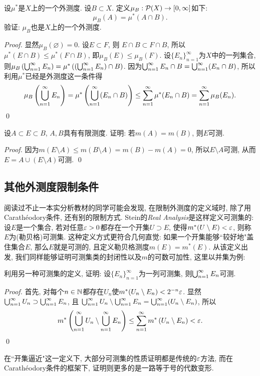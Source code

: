 \begin{exercise}
    设$\mu^*$是$X$上的一个外测度.
    设$B \subset X$. 定义$\mu_B: \mathcal{P}(X) \to [0, \infty]$如下:
    $$\mu_B(A) = \mu^*(A \cap B).$$
    验证: $\mu_B$也是$X$上的一个外测度. 
\end{exercise}
\begin{proof}
    显然$\mu_B(\varnothing) = 0$. 设$E \subset F$, 则
    $E \cap B \subset F \cap B$, 所以$\mu^*(E \cap B) \leq \mu^*(F \cap B)$, 即$\mu_B(E) \leq \mu_B(F)$. 设$\{E_n\}_{n=1}^\infty$为$X$中的一列集合, 则$\mu_B\left(\bigcup_{n=1}^{\infty}E_n\right) = \mu^*\left( \left(\bigcup_{n=1}^{\infty}E_n\right) \cap B\right)$.
    因为$\bigcup_{n=1}^{\infty}E_n \cap B = \bigcup_{n=1}^{\infty}(E_n \cap B)$, 所以利用$\mu^*$已经是外测度这一条件得
    $$\mu_B\left(\bigcup_{n=1}^{\infty}E_n\right) = \mu^*\left(\bigcup_{n=1}^{\infty}(E_n \cap B)\right) \leq \sum_{n=1}^{\infty} \mu^*(E_n \cap B) = \sum_{n=1}^{\infty} \mu_B(E_n). $$
    \qed 
\end{proof}
\begin{exercise} %
    设$A \subset E \subset B$, $A,B$具有有限测度. 证明: 若$m(A) = m(B)$, 则$E$可测.
\end{exercise}
\begin{proof}
    因为$m(E \setminus A) \leq m(B \setminus A) = m(B) - m(A) = 0$, 所以$E \setminus A$可测, 
    从而$E = A \cup (E \setminus A)$可测. \qed 
\end{proof}


\subsection{其他外测度限制条件}
阅读过不止一本实分析教材的同学可能会发现, 在限制外测度的定义域时, 除了用Carath\'eodory条件, 还有别的限制方式. Stein的\textit{Real Analysis}是这样定义可测集的:
设$E$是一个集合, 若对任意$\varepsilon > 0$都存在一个开集$U \supset E$, 使得$m^*(U \setminus E) < \varepsilon$, 则称$E$为(勒贝格)可测集. 这种定义方式更符合几何直觉: 如果一个开集能够``较好地"盖住集合$E$, 那么$E$就是可测的, 且定义勒贝格测度$m(E) = m^*(E)$. 从该定义出发, 我们同样能够证明可测集类的封闭性以及$m$的可数可加性, 这里以并集为例:
\begin{example}
    利用另一种可测集的定义, 证明: 设$\{E_n\}_{n=1}^\infty$为一列可测集, 则$\bigcup_{n=1}^{\infty}E_n$可测.
\end{example}
\begin{proof}
    首先, 对每个$n \in \mathbb{N}$都存在$U_n$使$m^*(U_n \setminus E_n) < 2^{-n} \varepsilon$.
    显然$\bigcup_{n=1}^{\infty}U_n \supset \bigcup_{n=1}^{\infty}E_n$, 且
    $\bigcup_{n=1}^{\infty}U_n \setminus \bigcup_{n=1}^{\infty}E_n = \bigcup_{n=1}^{\infty} (U_n \setminus E_n)$, 所以
    $$  m^*\left(\bigcup_{n=1}^{\infty}U_n \setminus \bigcup_{n=1}^{\infty}E_n\right)
    \leq \sum_{n=1}^{\infty}m^*\left(U_n \setminus E_n\right) < \varepsilon. $$
    \qed 
\end{proof}
在``开集逼近"这一定义下, 大部分可测集的性质证明都是传统的$\varepsilon$方法, 而在Carath\'eodory条件的框架下, 证明则更多的是一路等于号的代数变形. 


